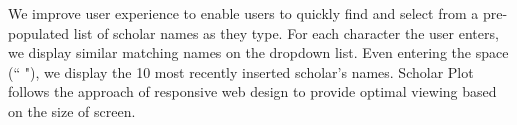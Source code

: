 
We improve user experience to enable users to quickly find and select from a pre-populated list of scholar names as they type. For each character the user enters, we display similar matching names on the dropdown list. Even entering the space (`` "), we display the 10 most recently inserted scholar's names. Scholar Plot follows the approach of responsive web design to provide optimal viewing based on the size of screen.



